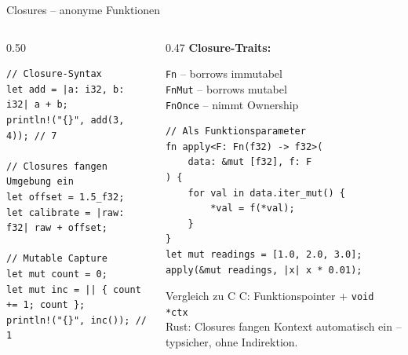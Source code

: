 \documentclass[%
  aspectratio=169,
  10pt
]{beamer}
\begin{document}
\begin{frame}[fragile]{Closures -- anonyme Funktionen}
  \begin{columns}[T]
    \begin{column}{0.50\textwidth}
\begin{lstlisting}
// Closure-Syntax
let add = |a: i32, b: i32| a + b;
println!("{}", add(3, 4)); // 7

// Closures fangen Umgebung ein
let offset = 1.5_f32;
let calibrate = |raw: f32| raw + offset;

// Mutable Capture
let mut count = 0;
let mut inc = || { count += 1; count };
println!("{}", inc()); // 1
\end{lstlisting}
    \end{column}
    \begin{column}{0.47\textwidth}
      \textbf{Closure-Traits:}
      \begin{block}{}
        \small
        \texttt{Fn} -- borrows immutabel\\
        \texttt{FnMut} -- borrows mutabel\\
        \texttt{FnOnce} -- nimmt Ownership
      \end{block}
\begin{lstlisting}
// Als Funktionsparameter
fn apply<F: Fn(f32) -> f32>(
    data: &mut [f32], f: F
) {
    for val in data.iter_mut() {
        *val = f(*val);
    }
}
let mut readings = [1.0, 2.0, 3.0];
apply(&mut readings, |x| x * 0.01);
\end{lstlisting}
      \begin{exampleblock}{Vergleich zu C}
        \small C: Funktionspointer + \texttt{void *ctx}\\
        Rust: Closures fangen Kontext automatisch
        ein -- typsicher, ohne Indirektion.
      \end{exampleblock}
    \end{column}
  \end{columns}
\end{frame}
\end{document}
